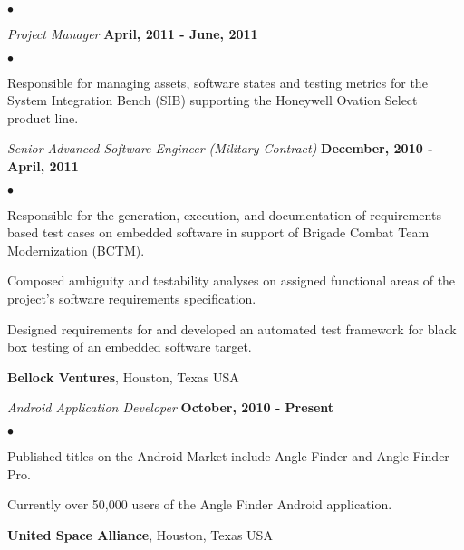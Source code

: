 \documentclass[margin,line]{res}
\newenvironment{list2}{
  \begin{list}{$\bullet$}{%
      \setlength{\itemsep}{0in}
      \setlength{\parsep}{0in} \setlength{\parskip}{0in}
      \setlength{\topsep}{0in} \setlength{\partopsep}{0in} 
      \setlength{\leftmargin}{0.2in}}}{\end{list}}
\begin{document}
\begin{resume}
\begin{list2}
\end{list2}
{\em Project Manager} \hfill {\bf April, 2011 - June, 2011}
\vspace*{.05in}
\begin{list2}
\item Responsible for managing assets, software states and testing metrics for the System Integration Bench (SIB) supporting the Honeywell Ovation Select product line.
\end{list2}
{\em Senior Advanced Software Engineer (Military Contract)} \hfill {\bf December, 2010 - April, 2011} \vspace*{.05in}
\begin{list2}
\item Responsible for the generation, execution, and documentation of requirements based test cases on embedded software in support of Brigade Combat Team Modernization (BCTM).
\item Composed ambiguity and testability analyses on assigned functional areas of the project's software requirements specification.
\item Designed requirements for and developed an automated test framework for black box testing of an embedded software target.
\end{list2}
{\bf Bellock Ventures}, Houston, Texas USA

\vspace{-.4cm}
{\em Android Application Developer} \hfill {\bf October, 2010 - Present}
\vspace*{.05in}
\begin{list2}
\item Published titles on the Android Market include Angle Finder and Angle Finder Pro.
\item Currently over 50,000 users of the Angle Finder Android application.
\end{list2}
{\bf United Space Alliance}, Houston, Texas USA


\end{resume}
\end{document}
